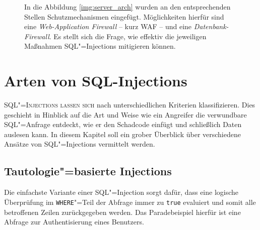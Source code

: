 \begin{figure}
\begin{margincap}
\centering
{}
\caption{In die Abbildung \ref{img:server_arch} wurden an den entsprechenden Stellen Schutzmechanismen eingefügt. Möglichkeiten hierfür sind eine \emph{Web-Application Firewall} -- kurz WAF -- und eine \emph{Datenbank-Firewall}. Es stellt sich die Frage, wie effektiv die jeweiligen Maßnahmen SQL"=Injections mitigieren können.}
\label{img:protected_server_arch}
\end{margincap}
\end{figure}

\chapter{Arten von SQL-Injections}
\lettrine[lines=2]{S}{QL"=Injections lassen sich}  nach unterschiedlichen Kriterien klassifizieren. Dies geschieht in Hinblick auf die Art und Weise wie ein Angreifer die verwundbare SQL"=Anfrage entdeckt, wie er den Schadcode einfügt und schließlich Daten auslesen kann. In diesem Kapitel soll ein grober Überblick über verschiedene Ansätze von SQL"=Injections vermittelt werden.

\section{Tautologie"=basierte Injections}

Die einfachste Variante einer SQL"=Injection sorgt dafür, dass eine logische Überprüfung im \texttt{WHERE}"=Teil der Abfrage immer zu \texttt{true} evaluiert und somit alle betroffenen Zeilen zurückgegeben werden. Das Paradebeispiel hierfür ist eine Abfrage zur Authentisierung eines Benutzers.


